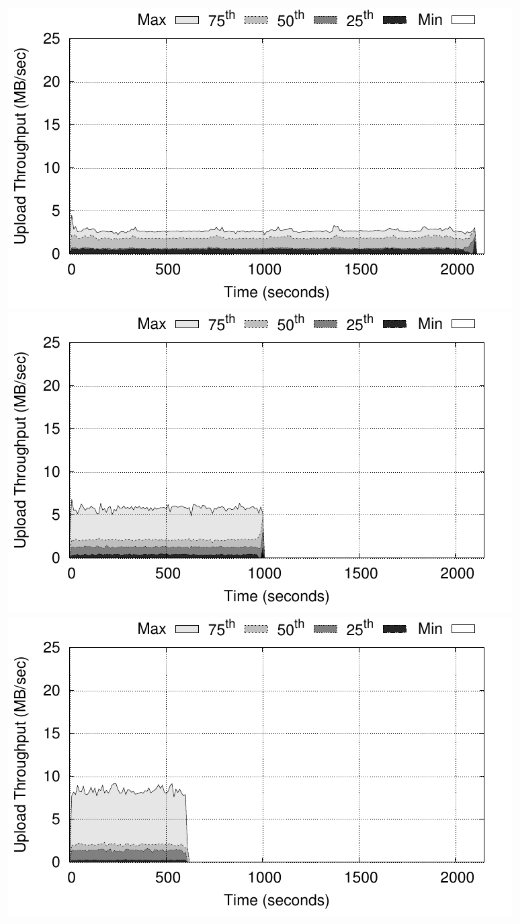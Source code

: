\begin{minipage}{\linewidth}
\begin{minipage}{0.3\linewidth}
  \end{minipage}
  \hspace{0.03\linewidth}
  \begin{minipage}{0.3\linewidth}
    \captionsetup{font=scriptsize}
    \includegraphics[width=\linewidth]{Figures/plots/secure_streams/throughput/tput_tx_percentiles_1-workers-encrypted-fullsgx}
    \includegraphics[width=\linewidth]{Figures/plots/secure_streams/throughput/tput_tx_percentiles_2-workers-encrypted-fullsgx}
    \includegraphics[width=\linewidth]{Figures/plots/secure_streams/throughput/tput_tx_percentiles_4-workers-encrypted-fullsgx}

\end{minipage}
\end{minipage}
